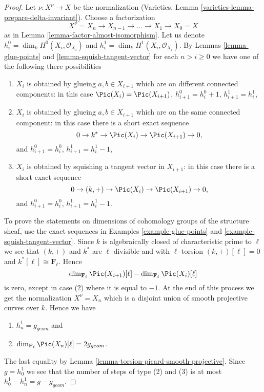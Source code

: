 \begin{proof}
Let $\nu : X^\nu \to X$ be the normalization
(Varieties, Lemma \ref{varieties-lemma-prepare-delta-invariant}).
Choose a factorization
$$
X^\nu = X_n \to X_{n - 1} \to \ldots \to X_1 \to X_0 = X
$$
as in Lemma \ref{lemma-factor-almost-isomorphism}.
Let us denote $h^0_i = \dim_k H^0(X_i, \mathcal{O}_{X_i})$
and $h^1_i = \dim_k H^1(X_i, \mathcal{O}_{X_i})$.
By Lemmas \ref{lemma-glue-points} and \ref{lemma-squish-tangent-vector}
for each $n > i \geq 0$ we have
one of the following there possibilities
\begin{enumerate}
\item $X_i$ is obtained by glueing $a, b \in X_{i + 1}$
which are on different connected components: in this case
$\Pic(X_i) = \Pic(X_{i + 1})$,
$h^0_{i + 1} = h^0_i + 1$, $h^1_{i + 1} = h^1_i$,
\item $X_i$ is obtained by glueing $a, b \in X_{i + 1}$
which are on the same connected component: in this case
there is a short exact sequence
$$
0 \to k^* \to \Pic(X_i) \to \Pic(X_{i + 1}) \to 0,
$$
and $h^0_{i + 1} = h^0_i$, $h^1_{i + 1} = h^1_i - 1$,
\item $X_i$ is obtained by squishing a tangent vector in $X_{i + 1}$:
in this case there is a short exact sequence
$$
0 \to (k, +) \to \Pic(X_i) \to \Pic(X_{i + 1}) \to 0,
$$
and $h^0_{i + 1} = h^0_i$, $h^1_{i + 1} = h^1_i - 1$.
\end{enumerate}
To prove the statements on dimensions of cohomology groups of the
structure sheaf, use the exact sequences in
Examples \ref{example-glue-points} and \ref{example-squish-tangent-vector}.
Since $k$ is algebraically closed of characteristic prime to $\ell$
we see that $(k, +)$ and $k^*$ are $\ell$-divisible and with
$\ell$-torsion $(k, +)[\ell] = 0$ and $k^*[\ell] \cong \mathbf{F}_\ell$.
Hence
$$
\dim_{\mathbf{F}_\ell} \Pic(X_{i + 1})[\ell] -
\dim_{\mathbf{F}_\ell}\Pic(X_i)[\ell]
$$
is zero, except in case (2) where it is equal to $-1$.
At the end of this process we get the normalization
$X^\nu = X_n$ which is a disjoint union of smooth projective
curves over $k$. Hence we have
\begin{enumerate}
\item $h^1_n = g_{geom}$ and
\item $\dim_{\mathbf{F}_\ell} \Pic(X_n)[\ell] = 2g_{geom}$.
\end{enumerate}
The last equality by Lemma \ref{lemma-torsion-picard-smooth-projective}.
Since $g = h^1_0$ we see that the number of steps of type
(2) and (3) is at most $h^1_0 - h^1_n = g - g_{geom}$.

\end{proof}
